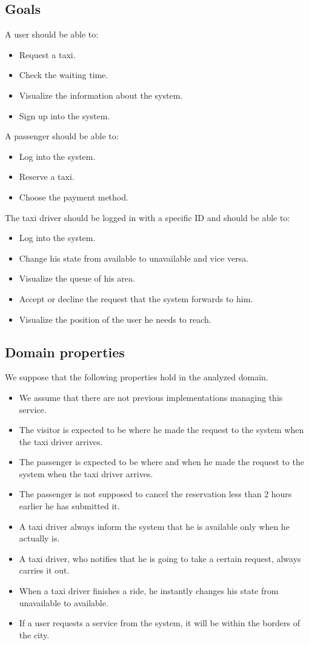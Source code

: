 \documentclass[18pt,oneside,a4paper, titlepage]{article}
\begin{document}
	\subsection{Goals}
	A user should be able to:
	\begin{itemize}
		\item Request a taxi.
		\item Check the waiting time.
		\item Visualize the information about the system.
		\item Sign up into the system.
	\end{itemize}
	A passenger should be able to:
	\begin{itemize}
		\item Log into the system.
		\item Reserve a taxi.
		\item Choose the payment method.
	\end{itemize}
	The taxi driver should be logged in with a specific ID and should be able to:
	\begin{itemize}
		\item Log into the system.
		\item Change his state from available to unavailable and vice versa.
		\item Visualize the queue of his area.
		\item Accept or decline the request that the system forwards to him.
		\item Visualize the position of the user he needs to reach.
	\end{itemize}

	\subsection{Domain properties}
	We suppose that the following properties hold in the analyzed domain.
	\begin{itemize}
		\item We assume that there are not previous implementations managing this service.
		\item The visitor is expected to be where he made the request to the system when the taxi driver arrives.
		\item The passenger is expected to be where and when he made the request to the system when the taxi driver arrives.
		\item The passenger is not supposed to cancel the reservation less than 2 hours earlier he has submitted it.
		\item A taxi driver always inform the system that he is available only when he actually is.
		\item A taxi driver, who notifies that he is going to take a certain request, always carries it out.
		\item When a taxi driver finishes a ride, he instantly changes his state from unavailable to available.
		\item If a user requests a service from the system, it will be within the borders of the city.
		
	\end{itemize}
\end{document}
